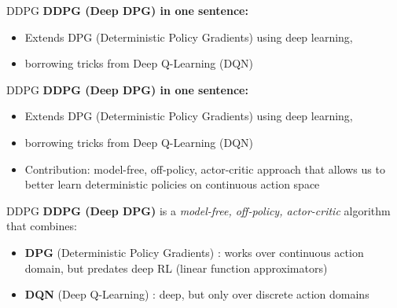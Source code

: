 \begin{frame}{DDPG}
\vspace{1em}
\textbf{DDPG (Deep DPG) in one sentence:}
\begin{itemize}
    \item Extends DPG (Deterministic Policy Gradients)  using deep learning,
    \item borrowing tricks from Deep Q-Learning (DQN) 
\end{itemize}
\end{frame}

\begin{frame}{DDPG}
\vspace{1em}
\textbf{DDPG (Deep DPG) in one sentence:}
\begin{itemize}
    \item Extends DPG (Deterministic Policy Gradients)  using deep learning,
    \item borrowing tricks from Deep Q-Learning (DQN) 
    \item Contribution: model-free, off-policy, actor-critic approach that allows us to better learn deterministic policies on continuous action space
\end{itemize}
\end{frame}

\begin{frame}{DDPG}
\vspace{1em}
\textbf{DDPG (Deep DPG)} is a \emph{model-free, off-policy, actor-critic} algorithm that combines:
\begin{itemize}
    \item \textbf{DPG} (Deterministic Policy Gradients) : works over continuous action domain, but predates deep RL (linear function approximators)
    \item \textbf{DQN} (Deep Q-Learning) : deep, but only over discrete action domains
\end{itemize}
\end{frame}
